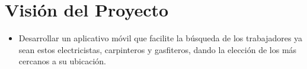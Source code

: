 \chapter{Visión del Proyecto}
\begin{itemize}
	\item Desarrollar un aplicativo móvil que facilite la búsqueda de los trabajadores ya sean estos electricistas, carpinteros y gasfiteros, dando la elección de los más cercanos a su ubicación.
\end{itemize}
